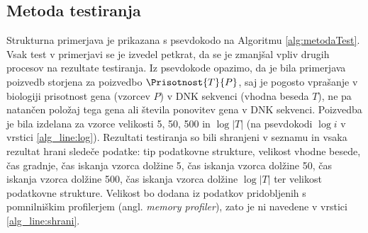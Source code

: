 \subsection{Metoda testiranja}
Strukturna primerjava je prikazana s psevdokodo na Algoritmu \ref{alg:metodaTest}. Vsak test v primerjavi se je izvedel petkrat, da se je zmanjšal vpliv drugih procesov na rezultate testiranja. Iz psevdokode opazimo, da je bila primerjava poizvedb storjena za poizvedbo $\Prisotnost{T}{P}$, saj je pogosto vprašanje v biologiji prisotnost gena (vzorcev $P$) v DNK sekvenci (vhodna beseda $T$), ne pa natančen položaj tega gena ali števila ponovitev gena v DNK sekvenci. Poizvedba je bila izdelana za vzorce velikosti 5, 50, 500 in $\log{|T|}$ (na psevdokodi $\log{i}$ v vrstici \ref{alg_line:log}). Rezultati testiranja so bili shranjeni v seznamu in vsaka rezultat hrani sledeče podatke: tip podatkovne strukture, velikost vhodne besede, čas gradnje, čas iskanja vzorca dolžine 5, čas iskanja vzorca dolžine 50, čas iskanja vzorca dolžine 500, čas iskanja vzorca dolžine $\log{|T|}$ ter velikost podatkovne strukture. Velikost bo dodana iz podatkov pridobljenih s pomnilniškim profilerjem (angl. \textit{memory profiler}), zato je ni navedene v vrstici \ref{alg_line:shrani}. 


